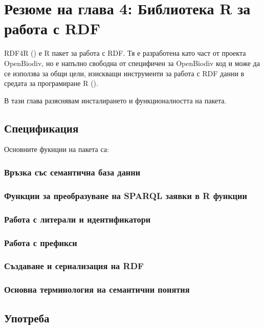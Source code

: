 \chapter{Резюме на глава 4: Библиотека R за работа с RDF}
\label{chapter-rdf4r}

RDF4R () е R пакет за работа с RDF. Тя е разработена като част от проекта OpenBiodiv, но е напълно свободна от специфичен за OpenBiodiv код и може да се използва за общи цели, изискващи инструменти за работа с RDF данни в средата за програмиране R (\cite{r_core_team_r:_2016}).

В тази глава разяснявам инсталирането и функционалността на пакета.

\section{Спецификация}

Основните фукнции на пакета са:

\subsection{Връзка със семантична база данни}

\subsection{Функции за преобразуване на SPARQL заявки в R функции}

\subsection{Работа с литерали и идентификатори}

\subsection{Работа с префикси}

\subsection{Създаване и сериализация на RDF}

\subsection{Основна терминология на семантични понятия}

\section{Употреба}

